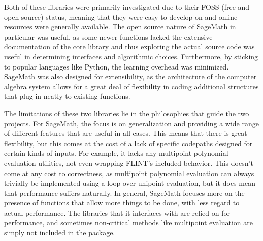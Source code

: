 \documentclass[pageno]{jpaper}
\begin{document}
Both of these libraries were primarily investigated due to their FOSS (free and open source) status, meaning that they were easy to develop on and online resources were generally available.
The open source nature of SageMath in particular was useful, as some newer functions lacked the extensive documentation of the core library and thus exploring the actual source code was useful in determining interfaces and algorithmic choices.
Furthermore, by sticking to popular languages like Python, the learning overhead was minimized.
SageMath was also designed for extensibility, as the architecture of the computer algebra system allows for a great deal of flexibility in coding additional structures that plug in neatly to existing functions.

The limitations of these two libraries lie in the philosophies that guide the two projects.
For SageMath, the focus is on generalization and providing a wide range of different features that are useful in all cases.
This means that there is great flexibility, but this comes at the cost of a lack of specific codepaths designed for certain kinds of inputs.
For example, it lacks any multipoint polynomial evaluation utilities, not even wrapping FLINT's included behavior.
This doesn't come at any cost to correctness, as multipoint polynomial evaluation can always trivially be implemented using a loop over unipoint evaluation, but it does mean that performance suffers naturally.
In general, SageMath focuses more on the presence of functions that allow more things to be done, with less regard to actual performance.
The libraries that it interfaces with are relied on for performance, and sometimes non-critical methods like multipoint evaluation are simply not included in the package.
\end{document}
